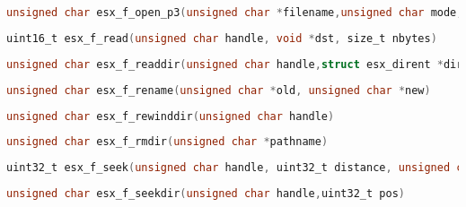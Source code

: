\documentclass[11pt]{book}
\def\lthtmlcheckvsize{\ifdim\ht\sizebox<\vsize 
  \ifdim\wd\sizebox<\hsize\expandafter\hfill\fi \expandafter\vfill
  \else\expandafter\vss\fi}%
\begin{document}
{\newpage\clearpage
{}%
\begin{lstlisting}[language=C]
unsigned char esx_f_open_p3(unsigned char *filename,unsigned char mode,struct esx_p3_hdr *h)
\end{lstlisting}%
\lthtmlfigureZ
\lthtmlcheckvsize\clearpage}

{\newpage\clearpage
{}%
\begin{lstlisting}[language=C]
uint16_t esx_f_read(unsigned char handle, void *dst, size_t nbytes)
\end{lstlisting}%
\lthtmlfigureZ
\lthtmlcheckvsize\clearpage}

{\newpage\clearpage
{}%
\begin{lstlisting}[language=C]
unsigned char esx_f_readdir(unsigned char handle,struct esx_dirent *dirent)
\end{lstlisting}%
\lthtmlfigureZ
\lthtmlcheckvsize\clearpage}

{\newpage\clearpage
{}%
\begin{lstlisting}[language=C]
unsigned char esx_f_rename(unsigned char *old, unsigned char *new)
\end{lstlisting}%
\lthtmlfigureZ
\lthtmlcheckvsize\clearpage}

{\newpage\clearpage
{}%
\begin{lstlisting}[language=C]
unsigned char esx_f_rewinddir(unsigned char handle)
\end{lstlisting}%
\lthtmlfigureZ
\lthtmlcheckvsize\clearpage}

{\newpage\clearpage
{}%
\begin{lstlisting}[language=C]
unsigned char esx_f_rmdir(unsigned char *pathname)
\end{lstlisting}%
\lthtmlfigureZ
\lthtmlcheckvsize\clearpage}

{\newpage\clearpage
{}%
\begin{lstlisting}[language=C]
uint32_t esx_f_seek(unsigned char handle, uint32_t distance, unsigned char whence)
\end{lstlisting}%
\lthtmlfigureZ
\lthtmlcheckvsize\clearpage}

{\newpage\clearpage
{}%
\begin{lstlisting}[language=C]
unsigned char esx_f_seekdir(unsigned char handle,uint32_t pos)
\end{lstlisting}%
\lthtmlfigureZ
\lthtmlcheckvsize\clearpage}
\end{document}
